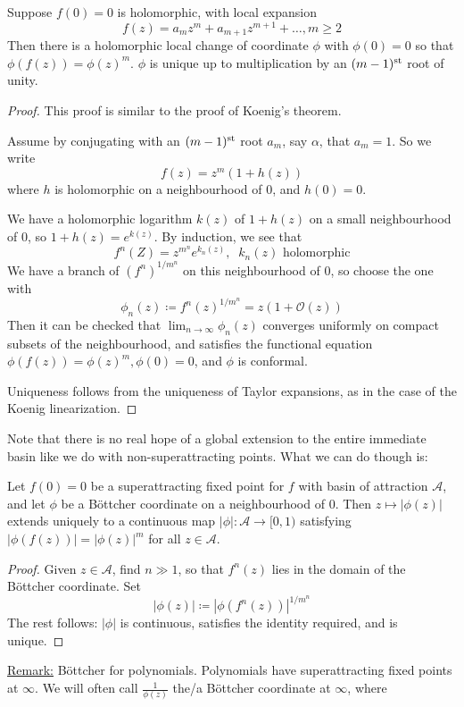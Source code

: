 \documentclass[10pt,a4paper]{article}
\begin{document}
\begin{theorem}[B\"ottcher 1904]
  Suppose $f(0) = 0$ is holomorphic, with local expansion
  \[f(z) = a_mz^m + a_{m+1}z^{m+1}+\ldots, m \geq 2\]
  Then there is a holomorphic local change of coordinate $\phi$ with $\phi(0) = 0$ so that $\phi(f(z)) = \phi(z)^m$. $\phi$ is unique up to multiplication by an $(m-1)\th[st]$ root of unity.
\end{theorem}
\begin{proof}
  This proof is similar to the proof of Koenig's theorem.

  Assume by conjugating with an $(m-1)\th[st]$ root $a_m$, say $\alpha$, that $a_m = 1$. So we write
  \[ f(z) = z^m(1+h(z))\]
  where $h$ is holomorphic on a neighbourhood of $0$, and $h(0) = 0$.

  We have a holomorphic logarithm $k(z)$ of $1+h(z)$ on a small neighbourhood of $0$, so $1+h(z) = e^{k(z)}$. By induction, we see that
  \[f^n(Z) = z^{m^n}e^{k_n(z)},\;\;k_n(z)\text{ holomorphic}\]
  We have a branch of $(f^n)^{1/m^n}$ on this neighbourhood of $0$, so choose the one with
  \[\phi_n(z) \coloneqq f^n(z)^{1/m^n} = z(1+\mathcal{O}(z))\]
  Then it can be checked that $\lim_{n \to \infty} \phi_n(z)$ converges uniformly on compact subsets of the neighbourhood, and satisfies the functional equation $\phi(f(z)) = \phi(z)^m, \phi(0)=0$, and $\phi$ is conformal.

  Uniqueness follows from the uniqueness of Taylor expansions, as in the case of the Koenig linearization.
\end{proof}
Note that there is no real hope of a global extension to the entire immediate basin like we do with non-superattracting points. What we can do though is:
\begin{corollary}
  Let $f(0) = 0$ be a superattracting fixed point for $f$ with basin of attraction $\mathcal{A}$, and let $\phi$ be a B\"ottcher coordinate on a neighbourhood of $0$. Then $z \mapsto |\phi(z)|$ extends uniquely to a continuous map $|\phi|:\mathcal{A} \to [0,1)$ satisfying $|\phi(f(z))| = |\phi(z)|^m$ for all $z \in \mathcal{A}$.
\end{corollary}
\begin{proof}
  Given $z \in \mathcal{A}$, find $n \gg 1$, so that $f^n(z)$ lies in the domain of the B\"ottcher coordinate. Set
  \[|\phi(z)| \coloneqq |\phi(f^n(z))|^{1/m^n}\]
  The rest follows: $|\phi|$ is continuous, satisfies the identity required, and is unique.
\end{proof}
\underline{Remark:} B\"ottcher for polynomials. Polynomials have superattracting fixed points at $\infty$. We will often call $\frac{1}{\phi(z)}$ the/a B\"ottcher coordinate at $\infty$, where
\end{document}
